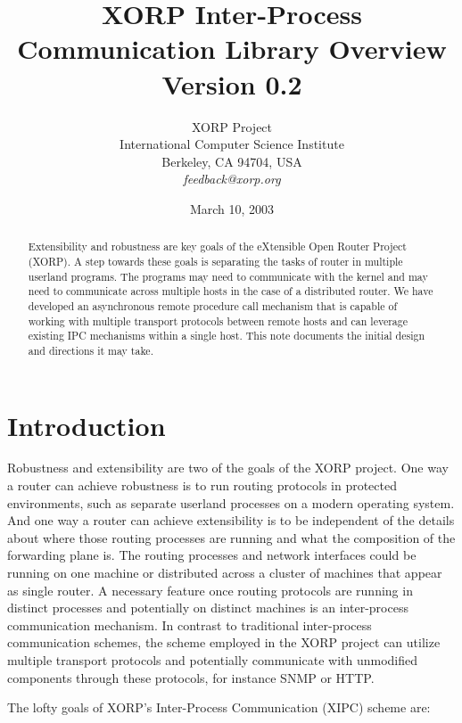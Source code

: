 \documentclass[11pt]{article}
\title{XORP Inter-Process Communication Library Overview \\
\vspace{1ex}
Version 0.2}
\author{ XORP Project					\\
	 International Computer Science Institute	\\
	 Berkeley, CA 94704, USA			\\
	 {\it feedback@xorp.org}
}
\date{March 10, 2003}
\begin{document}
\maketitle
\begin{abstract}
Extensibility and robustness are key goals of the eXtensible
Open Router Project (XORP).  A step towards these goals is separating
the tasks of router in multiple userland programs.  The programs may
need to communicate with the kernel and may need to communicate across
multiple hosts in the case of a distributed router.  We have developed
an asynchronous remote procedure call mechanism that is capable of
working with multiple transport protocols between remote hosts and can
leverage existing IPC mechanisms within a single host. This note
documents the initial design and directions it may take.
\end{abstract}

\section{Introduction}

Robustness and extensibility are two of the goals of the XORP project.
One way a router can achieve robustness is to run routing protocols in
protected environments, such as separate userland processes on a
modern operating system.  And one way a router can achieve
extensibility is to be independent of the details about where those
routing processes are running and what the composition of the
forwarding plane is.  The routing processes and network interfaces
could be running on one machine or distributed across a cluster of
machines that appear as single router.  A necessary feature once
routing protocols are running in distinct processes and potentially on
distinct machines is an inter-process communication mechanism.  In
contrast to traditional inter-process communication schemes, the
scheme employed in the XORP project can utilize multiple transport
protocols and potentially communicate with unmodified components
through these protocols, for instance SNMP or HTTP.

The lofty goals of XORP's Inter-Process Communication (XIPC) scheme are:
\end{document}

